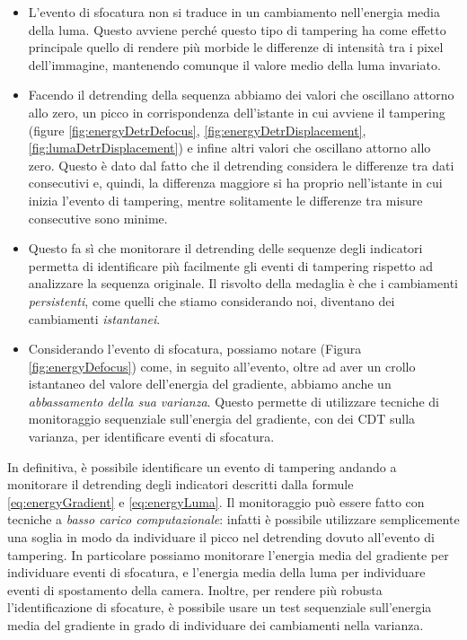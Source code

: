 \begin{itemize}
	\item L'evento di sfocatura non si traduce in un cambiamento nell'energia media della luma.
	Questo avviene perch\'e questo tipo di tampering ha come effetto principale quello di rendere pi\`u morbide le differenze di intensit\`a tra i pixel dell'immagine, mantenendo comunque il valore medio della luma invariato.
	\item Facendo il detrending della sequenza abbiamo dei valori che oscillano attorno allo zero, un picco in corrispondenza dell'istante in cui avviene il tampering (figure \ref{fig:energyDetrDefocus}, \ref{fig:energyDetrDisplacement}, \ref{fig:lumaDetrDisplacement}) e infine altri valori che oscillano attorno allo zero.
	Questo \`e dato dal fatto che il detrending considera le differenze tra dati consecutivi e, quindi, la differenza maggiore si ha proprio nell'istante in cui inizia l'evento di tampering, mentre solitamente le differenze tra misure consecutive sono minime. 
	\item Questo fa s\`i che monitorare il detrending delle sequenze degli indicatori permetta di identificare pi\`u facilmente gli eventi di tampering rispetto ad analizzare la sequenza originale.
	Il risvolto della medaglia \`e che i cambiamenti \textit{persistenti}, come quelli che stiamo considerando noi, diventano dei cambiamenti \textit{istantanei}.
	\item Considerando l'evento di sfocatura, possiamo notare (Figura \ref{fig:energyDefocus}) come, in seguito all'evento, oltre ad aver un crollo istantaneo del valore dell'energia del gradiente, abbiamo anche un \textit{abbassamento della sua varianza}.
	Questo permette di utilizzare tecniche di monitoraggio sequenziale sull'energia del gradiente, con dei CDT sulla varianza, per identificare eventi di sfocatura.
\end{itemize}
In definitiva, \`e possibile identificare un evento di tampering andando a monitorare il detrending degli indicatori descritti dalla formule \eqref{eq:energyGradient} e \eqref{eq:energyLuma}.
Il monitoraggio pu\`o essere fatto con tecniche a \textit{basso carico computazionale}: infatti \`e possibile utilizzare semplicemente una soglia in modo da individuare il picco nel detrending dovuto all'evento di tampering.
In particolare possiamo monitorare l'energia media del gradiente per individuare eventi di sfocatura, e l'energia media della luma per individuare eventi di spostamento della camera.
Inoltre, per rendere pi\`u robusta l'identificazione di sfocature, \`e possibile usare un test sequenziale sull'energia media del gradiente in grado di individuare dei cambiamenti nella varianza.\\
